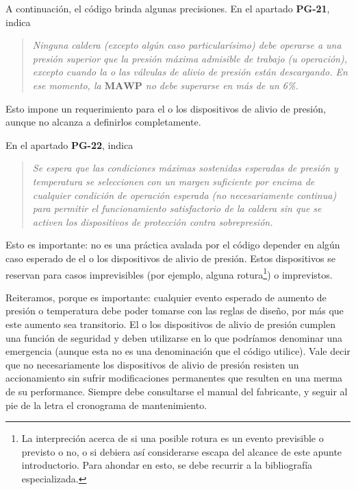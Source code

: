 A continuación, el código brinda algunas precisiones. En el apartado \textbf{PG-21}, indica

\begin{quote}
     \itshape
     \small
     Ninguna caldera (excepto algún caso particularísimo) debe operarse a una presión superior que la presión máxima admisible de trabajo (u operación), excepto cuando la o las válvulas de alivio de presión están descargando. En ese momento, la $\mathbf{MAWP}$ no debe superarse en más de un 6\%. 
\end{quote}

Esto impone un requerimiento para el o los dispositivos de alivio de presión, aunque no alcanza a definirlos completamente.

En el apartado \textbf{PG-22}, indica

\begin{quote}
     \itshape
     \small
     Se espera que las condiciones máximas sostenidas esperadas de presión y temperatura se seleccionen con un margen suficiente por encima de cualquier condición de operación esperada (no necesariamente continua) para permitir el funcionamiento satisfactorio de la caldera sin que se activen los dispositivos de protección contra sobrepresión.
\end{quote}

Esto es importante: no es una práctica avalada por el código depender en algún caso esperado de el o los dispositivos de alivio de presión. Estos dispositivos se reservan para casos imprevisibles (por ejemplo, alguna rotura\footnote{La interpreción acerca de si una posible rotura es un evento previsible o previsto o no, o si debiera así considerarse escapa del alcance de este apunte introductorio. Para ahondar en esto, se debe recurrir a la bibliografía especializada.}) o imprevistos.

Reiteramos, porque es importante: cualquier evento esperado de aumento de presión o temperatura debe poder tomarse con las reglas de diseño, por más que este aumento sea transitorio. El o los dispositivos de alivio de presión cumplen una función de seguridad y deben utilizarse en lo que podríamos denominar una emergencia (aunque esta no es una denominación que el código utilice). Vale decir que no necesariamente los dispositivos de alivio de presión resisten un accionamiento sin sufrir modificaciones permanentes que resulten en una merma de su performance. Siempre debe consultarse el manual del fabricante, y seguir al pie de la letra el cronograma de mantenimiento.

